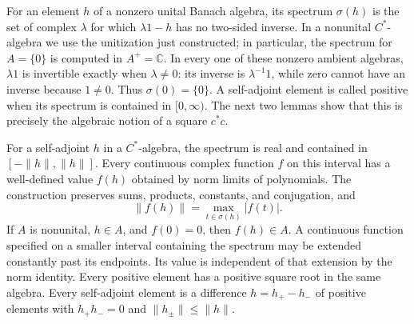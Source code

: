 \documentclass[11pt]{article}
\numberwithin{equation}{section}
\newcommand{\C}{\mathbb C}
\begin{document}
For an element $h$ of a nonzero unital Banach algebra, its spectrum $\sigma(h)$
is the set of complex $\lambda$ for which $\lambda1-h$ has no two-sided
inverse.  In a nonunital $C^*$-algebra we use the unitization just constructed;
in particular, the spectrum for $A=\{0\}$ is computed in $A^+=\C$.
In every one of these nonzero ambient algebras, $\lambda1$ is invertible
exactly when $\lambda\ne0$: its inverse is $\lambda^{-1}1$, while zero
cannot have an inverse because $1\ne0$.  Thus $\sigma(0)=\{0\}$.
A self-adjoint element is called positive when its spectrum is contained in
$[0,\infty)$.  The next two lemmas show that this is precisely the algebraic
notion of a square $c^*c$.

\begin{lemma}
\label{lem:cstar-calculus}
For a self-adjoint $h$ in a $C^*$-algebra, the spectrum is real and contained
in $[-\|h\|,\|h\|]$.  Every continuous complex function $f$ on this interval
has a well-defined value $f(h)$ obtained by norm limits of polynomials.
The construction preserves sums, products, constants, and conjugation, and
\[
 \|f(h)\|=\max_{t\in\sigma(h)}|f(t)|.
\]
If $A$ is nonunital, $h\in A$, and $f(0)=0$, then $f(h)\in A$.
A continuous function specified on a smaller interval containing the spectrum
may be extended constantly past its endpoints.  Its value is independent
of that extension by the norm identity.
Every positive element has a positive square root in the same algebra.
Every self-adjoint element is a difference $h=h_+-h_-$ of positive elements
with $h_+h_-=0$ and $\|h_\pm\|\leq\|h\|$.
\end{lemma}
\end{document}

